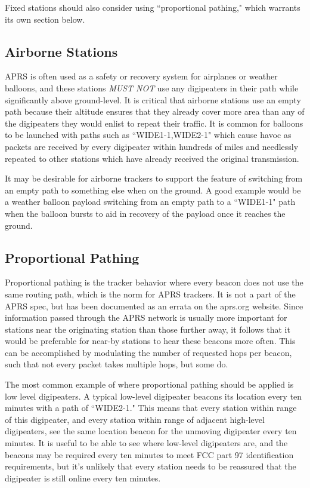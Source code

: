 Fixed stations should also consider using ``proportional pathing,"
which warrants its own section below.

\subsection{Airborne Stations}

APRS is often used as a safety or recovery system for airplanes or weather balloons,
and these stations \emph{MUST NOT} use any digipeaters in their path while
significantly above ground-level. \cite{nopathhigh}
It is critical that airborne stations use an empty path because their
altitude ensures that they already cover more area than any of the digipeaters
they would enlist to repeat their traffic.
It is common for balloons to be launched with paths such as ``WIDE1-1,WIDE2-1"
which cause havoc as packets are received by every digipeater within hundreds of
miles and needlessly repeated to other stations which have already received the
original transmission.

It may be desirable for airborne trackers to support the feature of switching from
an empty path to something else when on the ground.
A good example would be a weather balloon payload switching from an empty path
to a ``WIDE1-1" path when the balloon bursts to aid in recovery of the
payload once it reaches the ground.

\subsection{Proportional Pathing}

Proportional pathing is the tracker behavior where every beacon does not
use the same routing path, which is the norm for APRS trackers.
It is not a part of the APRS spec, but has been documented as an
errata on the aprs.org website. \cite{bobproppath}
Since information passed through the APRS network is usually more important
for stations near the originating station than those further away,
it follows that it would be preferable for near-by stations to hear these beacons
more often.
This can be accomplished by modulating the number of requested hops per beacon,
such that not every packet takes multiple hops, but some do.

The most common example of where proportional pathing should be applied is
low level digipeaters.
A typical low-level digipeater beacons its location every ten minutes with
a path of ``WIDE2-1."
This means that every station within range of this digipeater, 
and every station within range of adjacent high-level digipeaters,
see the same location beacon for the unmoving digipeater every ten minutes.
It is useful to be able to see where low-level digipeaters are,
and the beacons may be required every ten minutes to meet FCC part 97 identification
requirements,
but it's unlikely that every station needs to be reassured that the digipeater
is still online every ten minutes.

